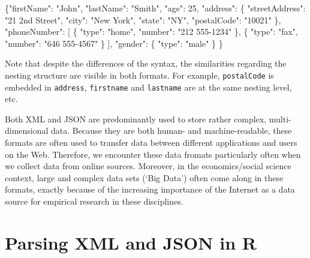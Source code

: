 \documentclass[
  12pt,
]{style/krantz}
\newenvironment{Shaded}{\begin{snugshade}}{\end{snugshade}}
\newcommand{\DataTypeTok}[1]{\textcolor[rgb]{0.13,0.29,0.53}{#1}}
\newcommand{\DecValTok}[1]{\textcolor[rgb]{0.00,0.00,0.81}{#1}}
\newcommand{\FunctionTok}[1]{\textcolor[rgb]{0.00,0.00,0.00}{#1}}
\newcommand{\OtherTok}[1]{\textcolor[rgb]{0.56,0.35,0.01}{#1}}
\newcommand{\StringTok}[1]{\textcolor[rgb]{0.31,0.60,0.02}{#1}}
\begin{document}
\begin{Shaded}
\begin{Highlighting}[]
\FunctionTok{\{}\DataTypeTok{"firstName"}\FunctionTok{:} \StringTok{"John"}\FunctionTok{,}
  \DataTypeTok{"lastName"}\FunctionTok{:} \StringTok{"Smith"}\FunctionTok{,}
  \DataTypeTok{"age"}\FunctionTok{:} \DecValTok{25}\FunctionTok{,}
  \DataTypeTok{"address"}\FunctionTok{:} \FunctionTok{\{}
    \DataTypeTok{"streetAddress"}\FunctionTok{:} \StringTok{"21 2nd Street"}\FunctionTok{,}
    \DataTypeTok{"city"}\FunctionTok{:} \StringTok{"New York"}\FunctionTok{,}
    \DataTypeTok{"state"}\FunctionTok{:} \StringTok{"NY"}\FunctionTok{,}
    \DataTypeTok{"postalCode"}\FunctionTok{:} \StringTok{"10021"}
  \FunctionTok{\},}
  \DataTypeTok{"phoneNumber"}\FunctionTok{:} \OtherTok{[}
    \FunctionTok{\{}
      \DataTypeTok{"type"}\FunctionTok{:} \StringTok{"home"}\FunctionTok{,}
      \DataTypeTok{"number"}\FunctionTok{:} \StringTok{"212 555{-}1234"}
    \FunctionTok{\}}\OtherTok{,}
    \FunctionTok{\{}
      \DataTypeTok{"type"}\FunctionTok{:} \StringTok{"fax"}\FunctionTok{,}
      \DataTypeTok{"number"}\FunctionTok{:} \StringTok{"646 555{-}4567"}
    \FunctionTok{\}}
  \OtherTok{]}\FunctionTok{,}
  \DataTypeTok{"gender"}\FunctionTok{:} \FunctionTok{\{}
    \DataTypeTok{"type"}\FunctionTok{:} \StringTok{"male"}
  \FunctionTok{\}}
\FunctionTok{\}}
\end{Highlighting}
\end{Shaded}

Note that despite the differences of the syntax, the similarities regarding the nesting structure are visible in both formats. For example, \texttt{postalCode} is embedded in \texttt{address}, \texttt{firstname} and \texttt{lastname} are at the same nesting level, etc.

Both XML and JSON are predominantly used to store rather complex, multi-dimensional data. Because they are both human- and machine-readable, these formats are often used to transfer data between different applications and users on the Web. Therefore, we encounter these data fromats particularly often when we collect data from online sources. Moreover, in the economics/social science context, large and complex data sets (`Big Data') often come along in these formats, exactly because of the increasing importance of the Internet as a data source for empirical research in these disciplines.

\hypertarget{parsing-xml-and-json-in-r}{%
\section{Parsing XML and JSON in R}\label{parsing-xml-and-json-in-r}}
\end{document}
